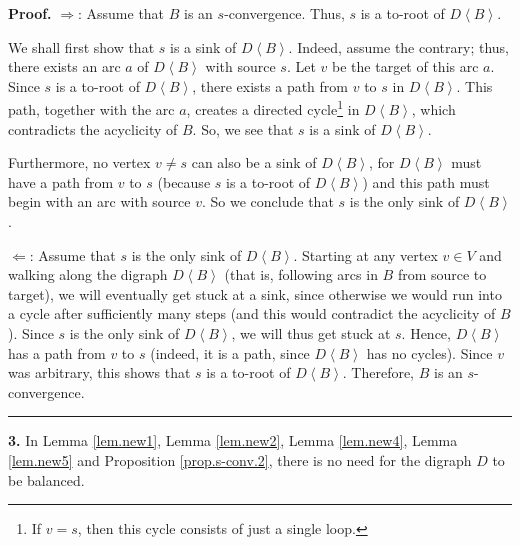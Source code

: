 \documentclass[numbers=enddot,12pt,final,onecolumn,notitlepage]{scrartcl}%
\theoremstyle{definition}
\newenvironment{proof}[1][Proof]{\noindent\textbf{#1.} }{\ \rule{0.5em}{0.5em}}
\theoremstyle{plainsl}
\begin{document}
\begin{proof}
$\Longrightarrow$: Assume that $B$ is an $s$-convergence. Thus, $s$ is a
to-root of $D\left\langle B\right\rangle $.

We shall first show that $s$ is a sink of $D\left\langle B\right\rangle $.
Indeed, assume the contrary; thus, there exists an arc $a$ of $D\left\langle
B\right\rangle $ with source $s$. Let $v$ be the target of this arc $a$. Since
$s$ is a to-root of $D\left\langle B\right\rangle $, there exists a path from
$v$ to $s$ in $D\left\langle B\right\rangle $. This path, together with the
arc $a$, creates a directed cycle\footnote{If $v=s$, then this cycle consists
of just a single loop.} in $D\left\langle B\right\rangle $, which contradicts
the acyclicity of $B$. So, we see that $s$ is a sink of $D\left\langle
B\right\rangle $.

Furthermore, no vertex $v\neq s$ can also be a sink of $D\left\langle
B\right\rangle $, for $D\left\langle B\right\rangle $ must have a path from
$v$ to $s$ (because $s$ is a to-root of $D\left\langle B\right\rangle $) and
this path must begin with an arc with source $v$. So we conclude that $s$ is
the only sink of $D\left\langle B\right\rangle $. \medskip

$\Longleftarrow$: Assume that $s$ is the only sink of $D\left\langle
B\right\rangle $. Starting at any vertex $v\in V$ and walking along the
digraph $D\left\langle B\right\rangle $ (that is, following arcs in $B$ from
source to target), we will eventually get stuck at a sink, since otherwise we
would run into a cycle after sufficiently many steps (and this would
contradict the acyclicity of $B$). Since $s$ is the only sink of
$D\left\langle B\right\rangle $, we will thus get stuck at $s$. Hence,
$D\left\langle B\right\rangle $ has a path from $v$ to $s$ (indeed, it is a
path, since $D\left\langle B\right\rangle $ has no cycles). Since $v$ was
arbitrary, this shows that $s$ is a to-root of $D\left\langle B\right\rangle
$. Therefore, $B$ is an $s$-convergence.
\end{proof}

\bigskip

\textbf{3.} In Lemma \ref{lem.new1}, Lemma \ref{lem.new2}, Lemma
\ref{lem.new4}, Lemma \ref{lem.new5} and Proposition \ref{prop.s-conv.2},
there is no need for the digraph $D$ to be balanced.
\end{document}
